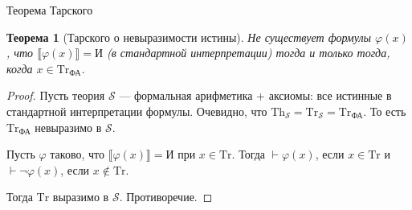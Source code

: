 \documentclass[aspectratio=169]{beamer}
\newtheorem{thm}{Теорема}[section]
\begin{document}
\begin{frame}{Теорема Тарского}
\begin{thm}[Тарского о невыразимости истины]
Не существует формулы $\varphi(x)$, что $\llbracket \varphi(x) \rrbracket = \text{И}$ (в стандартной интерпретации) тогда и только
тогда, когда $x \in \text{Tr}_\text{ФА}$. \end{thm}
\begin{proof}
Пусть теория $\mathcal{S}$ --- формальная арифметика + аксиомы: все истинные в стандартной интерпретации формулы.
Очевидно, что $\text{Th}_\mathcal{S} = \text{Tr}_\mathcal{S} = \text{Tr}_\text{ФА}$. 
То есть $\text{Tr}_\text{ФА}$ невыразимо в $\mathcal{S}$.

Пусть $\varphi$ таково, что $\llbracket\varphi(x)\rrbracket = \text{И}$ при $x \in \text{Tr}$.
Тогда $\vdash\varphi(x)$, если $x \in \text{Tr}$ и $\vdash\neg\varphi(x)$, если $x \notin\text{Tr}$.

Тогда $\text{Tr}$ выразимо в $\mathcal{S}$. Противоречие.
\end{proof}
\end{frame}
\end{document}
